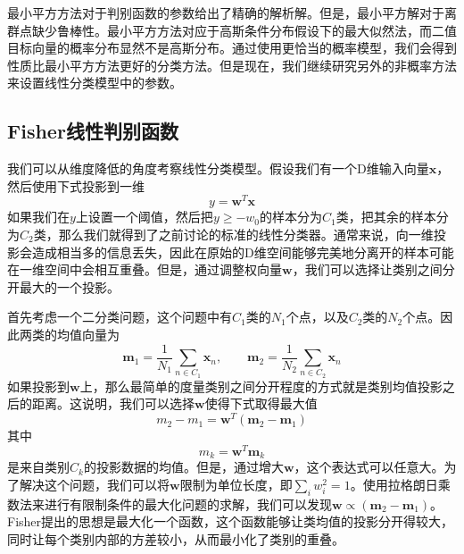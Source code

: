 最小平方方法对于判别函数的参数给出了精确的解析解。但是，最小平方解对于离群点缺少鲁棒性。最小平方方法对应于高斯条件分布假设下的最大似然法，而二值目标向量的概率分布显然不是高斯分布。通过使用更恰当的概率模型，我们会得到性质比最小平方方法更好的分类方法。但是现在，我们继续研究另外的非概率方法来设置线性分类模型中的参数。
\subsection*{Fisher线性判别函数}
我们可以从维度降低的角度考察线性分类模型。假设我们有一个D维输入向量$\boldsymbol{x}$，然后使用下式投影到一维
\begin{equation}
	y=\boldsymbol{w}^T\boldsymbol{x}
\end{equation}
如果我们在$y$上设置一个阈值，然后把$y\geqslant -w_0$的样本分为$C_1$类，把其余的样本分为$C_2$类，那么我们就得到了之前讨论的标准的线性分类器。通常来说，向一维投影会造成相当多的信息丢失，因此在原始的D维空间能够完美地分离开的样本可能在一维空间中会相互重叠。但是，通过调整权向量$\boldsymbol{w}$，我们可以选择让类别之间分开最大的一个投影。

首先考虑一个二分类问题，这个问题中有$C_1$类的$N_1$个点，以及$C_2$类的$N_2$个点。因此两类的均值向量为
\begin{equation}
\label{kka}
	\boldsymbol{m}_1=\frac{1}{N_1}\sum_{n\in C_1}\boldsymbol{x}_n,\qquad \boldsymbol{m}_2=\frac{1}{N_2}\sum_{n\in C_2}\boldsymbol{x}_n
\end{equation}
如果投影到$\boldsymbol{w}$上，那么最简单的度量类别之间分开程度的方式就是类别均值投影之后的距离。这说明，我们可以选择$\boldsymbol{w}$使得下式取得最大值
\begin{equation}
	m_2-m_1=\boldsymbol{w}^T(\boldsymbol{m}_2-\boldsymbol{m}_1)
\end{equation}
其中
\begin{equation}
\label{kkb}
	m_k=\boldsymbol{w}^T\boldsymbol{m}_k
\end{equation}
是来自类别$C_k$的投影数据的均值。但是，通过增大$\boldsymbol{w}$，这个表达式可以任意大。为了解决这个问题，我们可以将$\boldsymbol{w}$限制为单位长度，即$\sum_iw_i^2=1$。使用拉格朗日乘数法来进行有限制条件的最大化问题的求解，我们可以发现$\boldsymbol{w}\propto (\boldsymbol{m}_2-\boldsymbol{m}_1)$。Fisher提出的思想是最大化一个函数，这个函数能够让类均值的投影分开得较大，同时让每个类别内部的方差较小，从而最小化了类别的重叠。

